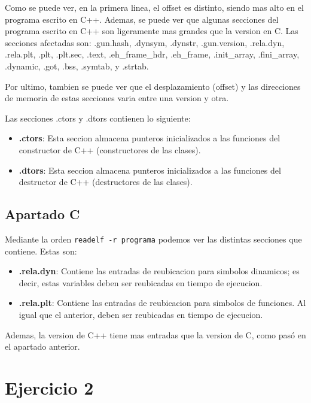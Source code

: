 \documentclass{article}
\begin{document}
Como se puede ver, en la primera linea, el offset es distinto, siendo mas alto en el programa escrito en C++. Ademas, se puede ver que algunas secciones del programa escrito en C++ son ligeramente mas grandes que la version en C. Las secciones afectadas son: .gun.hash, .dynsym, .dynstr, .gun.version, .rela.dyn, .rela.plt, .plt, .plt.sec, .text, .eh\_frame\_hdr, .eh\_frame, .init\_array, .fini\_array, .dynamic, .got, .bss, .symtab, y .strtab.

Por ultimo, tambien se puede ver que el desplazamiento (offset) y las direcciones de memoria de estas secciones varia entre una version y otra.


\bigskip

Las secciones .ctors y .dtors contienen lo siguiente:

\begin{itemize}
    \item \textbf{.ctors}: Esta seccion almacena punteros inicializados a las funciones del constructor de C++ (constructores de las clases).
    \item \textbf{.dtors}: Esta seccion almacena punteros inicializados a las funciones del destructor de C++ (destructores de las clases).
\end{itemize}


\subsection*{Apartado C}

Mediante la orden \verb|readelf -r programa| podemos ver las distintas secciones que contiene. Estas son:

\begin{itemize}
    \item \textbf{.rela.dyn}: Contiene las entradas de reubicacion para simbolos dinamicos; es decir, estas variables deben ser reubicadas en tiempo de ejecucion.
    \item \textbf{.rela.plt}: Contiene las entradas de reubicacion para simbolos de funciones. Al igual que el anterior, deben ser reubicadas en tiempo de ejecucion.
\end{itemize}

Ademas, la version de C++ tiene mas entradas que la version de C, como pasó en el apartado anterior.


\section*{Ejercicio 2}
\end{document}
